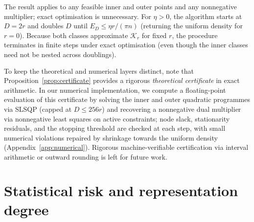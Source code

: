 The result applies to any feasible inner and outer points and any nonnegative multiplier; exact optimisation is unnecessary. For \(\eta>0\), the algorithm starts at \(D=2r\) and doubles \(D\) until \(E_D\le\eta r/(\pi n)\) (returning the uniform density for \(r=0\)). Because both classes approximate \(\mathcal K_r\) for fixed \(r\), the procedure terminates in finite steps under exact optimisation (even though the inner classes need not be nested across doublings).

To keep the theoretical and numerical layers distinct, note that Proposition~\ref{prop:certificate} provides a rigorous \emph{theoretical certificate} in exact arithmetic. In our numerical implementation, we compute a floating-point evaluation of this certificate by solving the inner and outer quadratic programmes via SLSQP (capped at \(D\le256r\)) and recovering a nonnegative dual multiplier via nonnegative least squares on active constraints; node slack, stationarity residuals, and the stopping threshold are checked at each step, with small numerical violations repaired by shrinkage towards the uniform density (Appendix~\ref{app:numerical}). Rigorous machine-verifiable certification via interval arithmetic or outward rounding is left for future work.

\section{Statistical risk and representation degree}\label{sec:risk}
